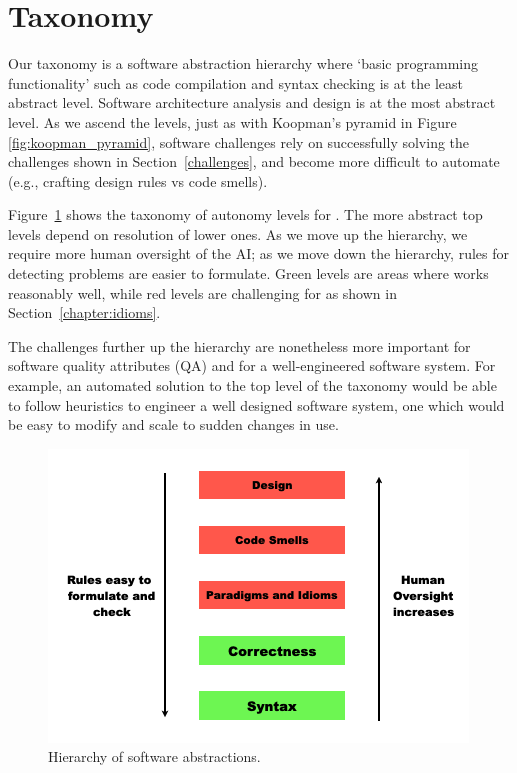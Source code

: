 \section{Taxonomy}
\label{taxonomy}
Our taxonomy is a software abstraction hierarchy where `basic programming functionality' such as code compilation and syntax checking is at the least abstract level.
Software architecture analysis and design is at the most abstract level.
As we ascend the levels, just as with Koopman's pyramid in Figure \ref{fig:koopman_pyramid}, software challenges rely on successfully solving the challenges shown in Section~\ref{challenges}, and become more difficult to automate (e.g., crafting design rules vs code smells). 

Figure~\ref{fig:taxonomy} shows the taxonomy of autonomy levels for \cct{}.  The more abstract top levels depend on resolution of lower ones. As we move up the hierarchy, we require more human oversight of the AI; as we move down the hierarchy, rules for detecting problems are easier to formulate. Green levels are areas where \AIDE{} works reasonably well, while red levels are challenging for \cop{} as shown in Section~\ref{chapter:idioms}.

The challenges further up the hierarchy are nonetheless more important for software quality attributes (QA) \cite{Ernst2017} and for a well-engineered software system.
For example, an automated solution to the top level of the taxonomy would be able to follow heuristics to engineer a well designed software system, one which would be easy to modify and scale to sudden changes in use.

\begin{figure}[hbt!]
    \centering
    \includegraphics[width=\linewidth]{Figures/taxonomy.png}
    \caption{Hierarchy of software abstractions.}
    \label{fig:taxonomy}
\end{figure}
